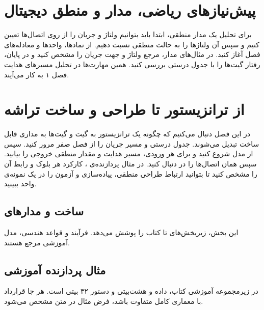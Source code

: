\clearpage
\setcounter{chapter}{-1}
\chapter{پیش‌نیازهای ریاضی، مدار و منطق دیجیتال}
\label{chap:foundations}
برای تحلیل یک مدار منطقی، ابتدا باید بتوانیم ولتاژ و جریان را از روی
اتصال‌ها تعیین کنیم و سپس آن ولتاژها را به حالت منطقی نسبت دهیم.
از نمادها، واحدها و معادله‌های فصل آغاز کنید. در مثال‌های مدار، مرجع
ولتاژ و جهت جریان را مشخص کنید و در پایان، رفتار گیت‌ها را با جدول
درستی بررسی کنید. همین مهارت‌ها در تحلیل مسیرهای هدایت فصل ۱ به کار می‌آیند.




\chapter{از ترانزیستور تا طراحی و ساخت تراشه}
\label{chap:introduction}
در این فصل دنبال می‌کنیم که چگونه یک ترانزیستور به گیت و گیت‌ها به
مداری قابل ساخت تبدیل می‌شوند. جدول درستی و مسیر جریان را از فصل صفر
مرور کنید. سپس از مدل  شروع کنید و برای
هر ورودی، مسیر هدایت و مقدار منطقی خروجی را بیابید. سپس همان اتصال‌ها
را در  دنبال کنید. در مثال پردازنده‌ی ، کارکرد هر بلوک
و رابط آن را مشخص کنید تا بتوانید ارتباط طراحی منطقی، پیاده‌سازی و
آزمون را در یک نمونه‌ی واحد ببینید.


\section{ساخت و  مدارهای }
\label{sec:book-fabrication}
این بخش، زیربخش‌های  تا  کتاب را پوشش می‌دهد.
فرآیند  و قواعد هندسی، مدل آموزشی مرجع هستند.

\section{مثال پردازنده آموزشی }
\label{sec:book-mips}
در زیرمجموعه آموزشی کتاب، داده و  هشت‌بیتی و دستور ۳۲ بیتی است.
هر جا قرارداد با معماری کامل متفاوت باشد، فرض مثال در متن مشخص می‌شود.

